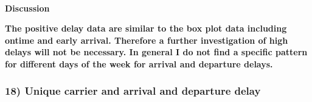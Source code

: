 \documentclass[11pt]{article}
\begin{document}
    \begin{center}
    \end{center}
    { \hspace*{\fill} \\}
    
    \textbf{Discussion}

\textbf{The positive delay data are similar to the box plot data
including ontime and early arrival. Therefore a further investigation of
high delays will not be necessary. In general I do not find a specific
pattern for different days of the week for arrival and departure
delays.}

    \hypertarget{unique-carrier-and-arrival-and-departure-delay}{%
\subsubsection{18) Unique carrier and arrival and departure
delay}\label{unique-carrier-and-arrival-and-departure-delay}}
\end{document}
